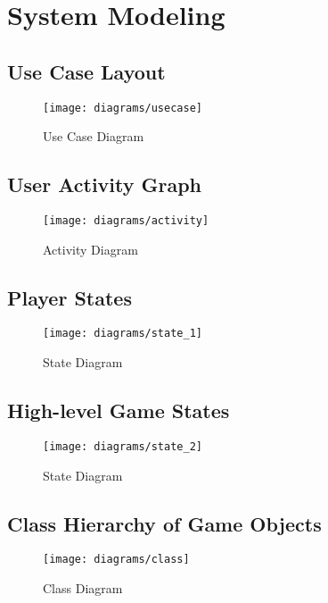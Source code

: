 \section{System Modeling}


\subsection{Use Case Layout}

\begin{figure}[!h]
\centering
\texttt{[image: diagrams/usecase]}
\caption{Use Case Diagram}\label{diag:usecase}
\end{figure}

\subsection{User Activity Graph}

\begin{figure}[!h]
\centering
\texttt{[image: diagrams/activity]}
\caption{Activity Diagram}\label{diag:activity}
\end{figure}

\subsection{Player States}

\begin{figure}[!h]
\centering
\texttt{[image: diagrams/state\_1]}
\caption{State Diagram}\label{diag:state_1}
\end{figure}

\subsection{High-level Game States}

\begin{figure}[!h]
\centering
\texttt{[image: diagrams/state\_2]}
\caption{State Diagram}\label{diag:state_2}
\end{figure}

\subsection{Class Hierarchy of Game Objects}

\begin{figure}[!h]
\centering
\texttt{[image: diagrams/class]}
\caption{Class Diagram}\label{diag:class}
\end{figure}

